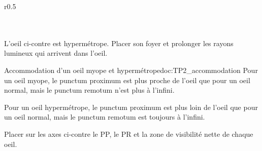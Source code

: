 \begin{wrapfigure}[10]{r}{0.5\linewidth}
  \centering
  \vspace*{-2pt}
   \\
   \\[8pt]

   \\[8pt]
\end{wrapfigure}

\mesure
L'oeil ci-contre est hypermétrope.
Placer son foyer et prolonger les rayons lumineux qui arrivent dans l'oeil.

\begin{doc}{Accommodation d'un oeil myope et hypermétrope}{doc:TP2_accommodation}
  Pour un oeil myope, le punctum proximum est plus proche de l'oeil que pour un oeil normal, mais le punctum remotum n'est plus à l'infini.

  Pour un oeil hypermétrope, le punctum proximum est plus loin de l'oeil que pour un oeil normal, mais le punctum remotum est toujours à l'infini.
\end{doc}

\mesure 
Placer sur les axes ci-contre le PP, le PR et la zone de visibilité nette de chaque oeil.